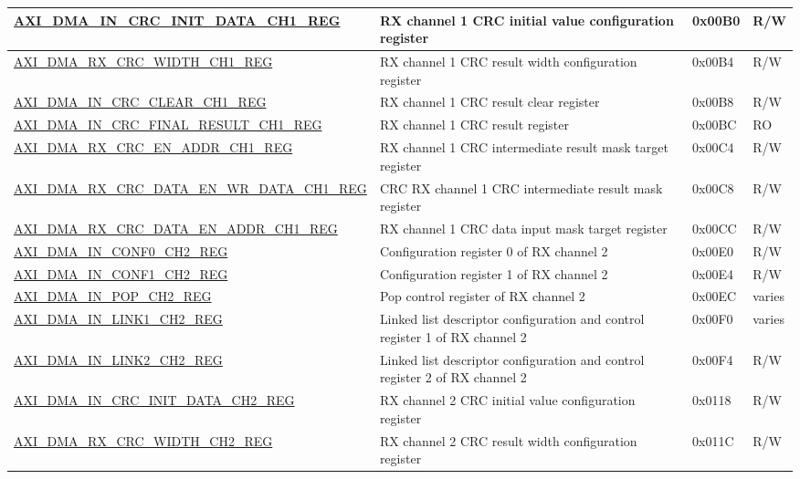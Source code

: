 \begin{longtable}{ | l | p{10cm} | p{1.3cm} | l | }
\hyperref[regdesc:AXIDMAINCRCINITDATACHNREG]{AXI\_DMA\_IN\_CRC\_INIT\_DATA\_CH1\_REG} & RX channel 1 CRC initial value configuration register & 0x00B0 & R/W \\ \hline
\hyperref[regdesc:AXIDMARXCRCWIDTHCHNREG]{AXI\_DMA\_RX\_CRC\_WIDTH\_CH1\_REG} & RX channel 1 CRC result width configuration register & 0x00B4 & R/W \\ \hline
\hyperref[regdesc:AXIDMAINCRCCLEARCHNREG]{AXI\_DMA\_IN\_CRC\_CLEAR\_CH1\_REG} & RX channel 1 CRC result clear register & 0x00B8 & R/W \\ \hline
\hyperref[regdesc:AXIDMAINCRCFINALRESULTCHNREG]{AXI\_DMA\_IN\_CRC\_FINAL\_RESULT\_CH1\_REG} & RX channel 1 CRC result register & 0x00BC & RO \\ \hline
\hyperref[regdesc:AXIDMARXCRCENADDRCHNREG]{AXI\_DMA\_RX\_CRC\_EN\_ADDR\_CH1\_REG} & RX channel 1 CRC intermediate result mask target register & 0x00C4 & R/W \\ \hline
\hyperref[regdesc:AXIDMARXCRCDATAENWRDATACHNREG]{AXI\_DMA\_RX\_CRC\_DATA\_EN\_WR\_DATA\_CH1\_REG} & CRC RX channel 1 CRC intermediate result mask register & 0x00C8 & R/W \\ \hline
\hyperref[regdesc:AXIDMARXCRCDATAENADDRCHNREG]{AXI\_DMA\_RX\_CRC\_DATA\_EN\_ADDR\_CH1\_REG} & RX channel 1 CRC data input mask target register & 0x00CC & R/W \\ \hline
\hyperref[regdesc:AXIDMAINCONF0CHNREG]{AXI\_DMA\_IN\_CONF0\_CH2\_REG} & Configuration register 0 of RX channel 2 & 0x00E0 & R/W \\ \hline
\hyperref[regdesc:AXIDMAINCONF1CHNREG]{AXI\_DMA\_IN\_CONF1\_CH2\_REG} & Configuration register 1 of RX channel 2 & 0x00E4 & R/W \\ \hline
\hyperref[regdesc:AXIDMAINPOPCHNREG]{AXI\_DMA\_IN\_POP\_CH2\_REG} & Pop control register of RX channel 2 & 0x00EC & varies \\ \hline
\hyperref[regdesc:AXIDMAINLINK1CHNREG]{AXI\_DMA\_IN\_LINK1\_CH2\_REG} & Linked list descriptor configuration and control register 1 of RX channel 2 & 0x00F0 & varies \\ \hline
\hyperref[regdesc:AXIDMAINLINK2CHNREG]{AXI\_DMA\_IN\_LINK2\_CH2\_REG} & Linked list descriptor configuration and control register 2 of RX channel 2 & 0x00F4 & R/W \\ \hline
\hyperref[regdesc:AXIDMAINCRCINITDATACHNREG]{AXI\_DMA\_IN\_CRC\_INIT\_DATA\_CH2\_REG} & RX channel 2 CRC initial value configuration register & 0x0118 & R/W \\ \hline
\hyperref[regdesc:AXIDMARXCRCWIDTHCHNREG]{AXI\_DMA\_RX\_CRC\_WIDTH\_CH2\_REG} & RX channel 2 CRC result width configuration register & 0x011C & R/W \\ \hline

\end{longtable}
